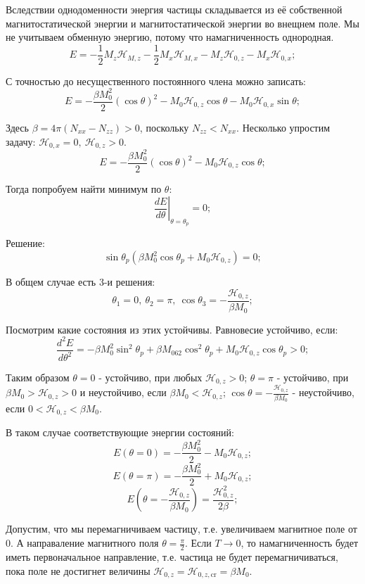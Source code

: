 \documentclass[a4paper, 14pt, russian]{article}
\newcommand{\be}{\begin{equation}}
\newcommand{\ee}{\end{equation}}
\begin{document}
	Вследствии однодоменности энергия частицы складывается из её собственной магнитостатической
	энергии и магнитостатической энергии во внещнем поле. Мы не учитываем обменную энергию,
	потому что намагниченность однородная.
	\be
		\label{eq174}
		E = -\frac{1}{2} M_z {\mathcal H}_{M, z} - \frac{1}{2} M_x {\mathcal H}_{M, x}
			- M_z \mathcal{H}_{0,z} - M_x \mathcal{H}_{0,x};
	\ee

	С точностью до несущественного постоянного члена можно записать:
	\be
		\label{eq175}
		E = - \frac{\beta M_0^2}{2} (\cos \theta)^2 - M_0 \mathcal{H}_{0,z} \cos \theta
			- M_0 \mathcal{H}_{0,x} \sin \theta;
	\ee

	Здесь $\beta = 4\pi (N_{xx} - N_{zz}) > 0$, поскольку $N_{zz} < N_{xx}$.
	Несколько упростим задачу: $\mathcal{H}_{0,x} = 0,~ \mathcal{H}_{0,z} > 0$.
	\be
		E = - \frac{\beta M_0^2}{2} (\cos \theta)^2 - M_0 \mathcal{H}_{0,z} \cos \theta;
	\ee  

	Тогда попробуем найти минимум по $\theta$:
	\be
		\left.\frac{dE}{d\theta}\right\rvert_{\theta  = \theta_p} = 0;
	\ee

	Решение:
	\be
		\sin \theta_p (\beta M_0^2 \cos \theta_p + M_0 \mathcal{H}_{0,z}) = 0;
	\ee

	В общем случае есть 3-и решения:
	\be
		\theta_1 = 0,~\theta_2 = \pi,~ 
			\cos \theta_3 = - \frac{\mathcal{H}_{0,z}}{\beta M_0};
	\ee

	Посмотрим какие состояния из этих устойчивы. Равновесие устойчиво, если:
	\be
		\frac{d^2 E}{d\theta^2} = - \beta M_0^2 \sin^2 \theta_p  + 
			\beta M_062 \cos^2 \theta_p + M_0 \mathcal{H}_{0,z} \cos \theta_p > 0;
	\ee

	Таким образом $\theta = 0$ - устойчиво, при любых $\mathcal{H}_{0,z} > 0$;
	$\theta= \pi$ -  устойчиво, при $\beta M_0 > \mathcal{H}_{0,z} > 0$ и 
	неустойчиво, если $\beta M_0 < \mathcal{H}_{0,z}$;
	$\cos \theta =  - \frac{\mathcal{H}_{0,z}}{\beta M_0}$ - неустойчиво, если
	$0 < \mathcal{H}_{0,z} < \beta M_0$.

	В таком случае соответствующие энергии состояний:
	\be
		E(\theta = 0) = - \frac{\beta M_0^2 }{2} - M_0 \mathcal{H}_{0,z};
	\ee
	\be
		E(\theta = \pi) = - \frac{\beta M_0^2 }{2} + M_0 \mathcal{H}_{0,z};
	\ee
	\be
		E(\theta =  -\frac{\mathcal{H}_{0, z}}{\beta M_0}) = \frac{\mathcal{H}_{0,z}^2 }{2\beta};
	\ee

	Допустим, что мы перемагничиваем частицу, т.е.
	увеличиваем магнитное поле от 0. А направаление
	магнитного поля $\theta  = \frac{\pi}{2}$. 
	Если $T \rightarrow 0$, то намагниченность будет иметь первоначальное
	направление, т.е. частица не будет перемагничиваться, пока поле не достигнет 
	величины $\mathcal{H}_{0, z} = \mathcal{H}_{0,z,\text{cr}} = \beta M_0$.
\end{document}
